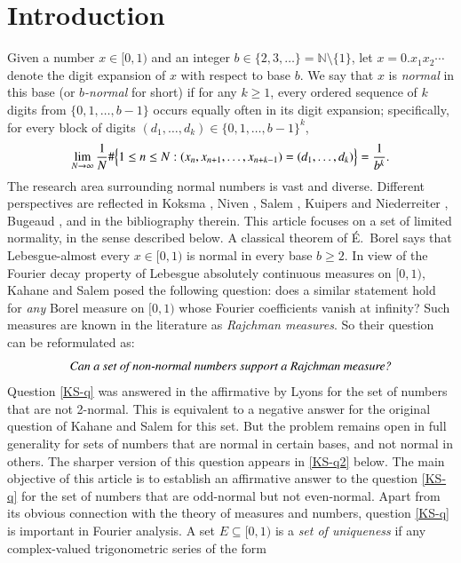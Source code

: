 \documentclass[12pt, twoside]{article}
\theoremstyle{definition}
\numberwithin{equation}{section}
\begin{document}
\section{Introduction}
Given a number $x \in [0,1)$ and an integer $b \in \{2, 3, \ldots \} = \mathbb N \setminus \{1\}$, let $x = 0.x_1x_2 \cdots$ denote the digit expansion of $x$ with respect to base $b$. We say that $x$ is {\em{normal}} in this base (or {\em{$b$-normal}} for short) if for any $k \geq 1$, every ordered sequence of $k$ digits from $\{0, 1, \ldots, b-1\}$ occurs equally often in its digit expansion; specifically, for every block of digits $(d_1, \ldots, d_k) \in \{0, 1, \ldots, b-1\}^k$,  
  \[ \lim_{N \rightarrow \infty} \frac{1}{N} \#\Bigl\{1 \leq n \leq N : (x_n, x_{n+1}, \ldots, x_{n+k-1}) = (d_1, \ldots, d_k) \Bigr\} = \frac{1}{b^k}. \] 
The research area surrounding normal numbers is vast and diverse. Different perspectives are reflected in Koksma \cite{Koksma-book}, Niven \cite{Niven-book}, Salem \cite{Salem-book}, Kuipers and Niederreiter \cite{KN-book},  Bugeaud \cite{b12}, and in the bibliography therein. This article focuses on a set of limited normality, in the sense described below. 
\vskip0.1in 
\noindent A classical theorem of \'E.~Borel \cite{b09} says that Lebesgue-almost every $x \in [0,1)$ is normal in every base $b \geq 2$. In view of the Fourier decay property of Lebesgue absolutely continuous measures on $[0,1)$, Kahane and Salem \cite{Kahane-Salem-64} posed the following question: does a similar statement hold for {\em{any}} Borel measure on $[0, 1)$ whose Fourier coefficients vanish at infinity? Such measures are known in the literature as {\em{Rajchman measures}}. So their question can be reformulated as: 
\begin{equation} \label{KS-q} 
{\text{\em{Can a set of non-normal numbers support a Rajchman measure?}}}
\end{equation} 
Question \eqref{KS-q} was answered in the affirmative by Lyons \cite{l86} for the set of numbers that are not 2-normal. This is equivalent to a negative answer for the original question of Kahane and Salem \cite{Kahane-Salem-64} for this set. But the problem remains open in full generality for sets of numbers that are normal in certain bases, and not normal in others. The sharper version of this question appears in \eqref{KS-q2} below. The main objective of this article is to establish an affirmative answer to the question \eqref{KS-q} for the set of numbers that are odd-normal but not even-normal. 
\vskip0.1in
\noindent Apart from its obvious connection with the theory of measures and numbers, question \eqref{KS-q} is important in Fourier analysis. A set $E \subseteq [0,1)$ is a {\em{set of uniqueness}} if any complex-valued trigonometric series of the form 
\end{document}
